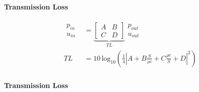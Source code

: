 \documentclass[ignorenonframetext]{beamer}
\begin{document}
\begin{frame}
\frametitle{}
\framesubtitle{\hspace{1.55cm}
Transmission Loss
}
  \begin{align*}
	\begin{matrix}
  	p_{in}\\
  	u_{in} 
    \end{matrix}
  	&=
  	\underbrace{ 
  	\left[
	\begin{matrix}
	A & B\\
	C & D
	\end{matrix} 
	\right]
	}_{TL}
	\begin{matrix}
  	p_{out}\\
  	u_{out} 
    \end{matrix}
	\\
	TL &= 10\, \text{log}_{10}\left(\frac{1}{4}\left|A+B\frac{S}{\rho c}+C\frac{\rho c}{S}+D\right|^2\right)
  \end{align*}
\end{frame}

\begin{frame}
\frametitle{}
\framesubtitle{\hspace{1.55cm}
Transmission Loss
}
\end{frame}
\end{document}

